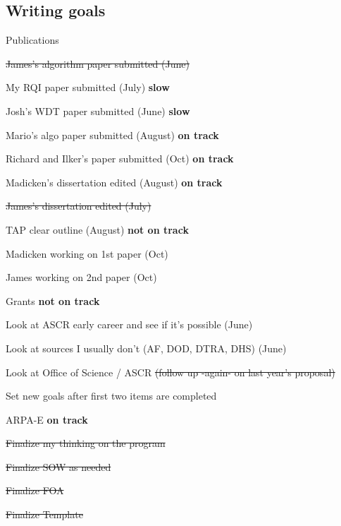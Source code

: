 \documentclass[12pt,twoside]{article}
\begin{document}
\subsection{Writing goals}
\begin{compactitem}
\item Publications
  \begin{compactitem}
  \item \st{James's algorithm paper submitted (June)}
  \item My RQI paper submitted (July) \textbf{slow}
  \item Josh's WDT paper submitted (June) \textbf{slow}
  \item Mario's algo paper submitted (August) \textbf{on track}
  \item Richard and Ilker's paper submitted (Oct) \textbf{on track}
  \item Madicken's dissertation edited (August) \textbf{on track}
  \item \st{James's dissertation edited (July)}
  \item TAP clear outline (August) \textbf{not on track}
  \item Madicken working on 1st paper (Oct)
  \item James working on 2nd paper (Oct)
  \end{compactitem}

\item Grants \textbf{not on track}
  \begin{compactitem}
  \item Look at ASCR early career and see if it's possible (June) 
  \item Look at sources I usually don't (AF, DOD, DTRA, DHS) (June) 
  \item Look at Office of Science / ASCR \st{(follow up -again- on last year's proposal)}
  \item Set new goals after first two items are completed
  \end{compactitem}
 
\item ARPA-E \textbf{on track}
  \begin{compactitem}
  \item \st{Finalize my thinking on the program}
  \item \st{Finalize SOW as needed}
  \item \st{Finalize FOA}
  \item \st{Finalize Template}
  \end{compactitem}
\end{compactitem}
\end{document}
